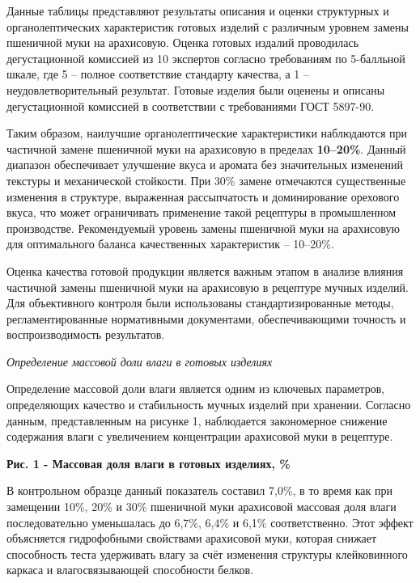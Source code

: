 \begin{multicols}{2}
Данные таблицы представляют результаты описания и оценки структурных и
органолептических характеристик готовых изделий с различным уровнем
замены пшеничной муки на арахисовую. Оценка готовых издалий проводилась
дегустационной комиссией из 10 экспертов согласно требованиям по
5-балльной шкале, где 5 -- полное соответствие стандарту качества, а 1
-- неудовлетворительный результат. Готовые изделия были оценены и
описаны дегустационной комиссией в соответствии с требованиями ГОСТ
5897-90.

Таким образом, наилучшие органолептические характеристики наблюдаются
при частичной замене пшеничной муки на арахисовую в пределах
{\bfseries 10--20\%}. Данный диапазон обеспечивает улучшение вкуса и
аромата без значительных изменений текстуры и механической стойкости.
При 30\% замене отмечаются существенные изменения в структуре,
выраженная рассыпчатость и доминирование орехового вкуса, что может
ограничивать применение такой рецептуры в промышленном производстве.
Рекомендуемый уровень замены пшеничной муки на арахисовую для
оптимального баланса качественных характеристик -- 10--20\%.

Оценка качества готовой продукции является важным этапом в анализе
влияния частичной замены пшеничной муки на арахисовую в рецептуре мучных
изделий. Для объективного контроля были использованы стандартизированные
методы, регламентированные нормативными документами, обеспечивающими
точность и воспроизводимость результатов.

\emph{Определение массовой доли влаги в готовых изделиях}

Определение массовой доли влаги является одним из ключевых параметров,
определяющих качество и стабильность мучных изделий при хранении.
Согласно данным, представленным на рисунке 1, наблюдается закономерное
снижение содержания влаги с увеличением концентрации арахисовой муки в
рецептуре.
\end{multicols}

{\bfseries Рис. 1 - Массовая доля влаги в готовых изделиях, \%}

В контрольном образце данный показатель составил 7,0\%, в то время как
при замещении 10\%, 20\% и 30\% пшеничной муки арахисовой массовая доля
влаги последовательно уменьшалась до 6,7\%, 6,4\% и 6,1\%
соответственно. Этот эффект объясняется гидрофобными свойствами
арахисовой муки, которая снижает способность теста удерживать влагу за
счёт изменения структуры клейковинного каркаса и влагосвязывающей
способности белков.

